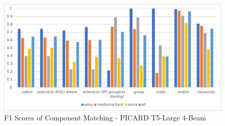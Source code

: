 \begin{figure}[h]
    \centering
    \includegraphics[width=1\textwidth]{pics/ez/F1eps}
    \caption{F1 Scores of Component Matching - PICARD T5-Large 4-Beam}
\end{figure}

